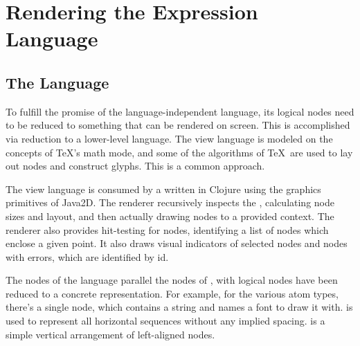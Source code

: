 %
%
\section{Rendering the Expression Language}

\subsection{The  Language}
\label{view}
To fulfill the promise of the language-independent  language, its logical nodes need to be reduced to something that can be rendered on screen. This is accomplished via reduction to a lower-level  language. The view language is modeled on the concepts of \TeX's math mode\cite{tex-math}, and some of the algorithms of \TeX\ are used to lay out nodes and construct glyphs. This is a common approach\cite{mathml}.

The view language is consumed by a  written in Clojure using the graphics primitives of Java2D\cite{java2d}. The renderer recursively inspects the , calculating node sizes and layout, and then actually drawing nodes to a provided context.
The renderer also provides hit-testing for nodes, identifying a list of  nodes which enclose a given point. It also draws visual indicators of selected nodes and nodes with errors, which are identified by id.











The nodes of the  language parallel the nodes of , with logical nodes have been reduced to a concrete representation. For example, for the various atom types, there's a single  node, which contains a string and names a font to draw it with.  is used to represent all horizontal sequences without any implied spacing.  is a simple vertical arrangement of left-aligned nodes.

